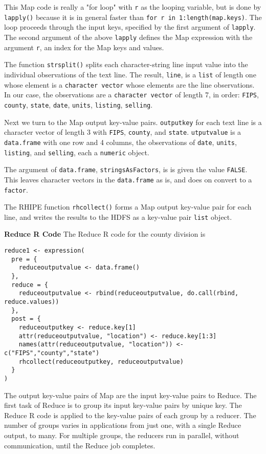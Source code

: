 This Map code is really a "for loop" with \texttt{r} as the looping variable,
but is done by \texttt{lapply()} because it is
in general faster than \texttt{for r in 1:length(map.keys)}.
The loop proceeds through the input keys, specified by the first argument of
\texttt{lapply}.  The second argument of the above \texttt{lapply} defines the Map expression
with the argument \texttt{r}, an index for the Map keys and values.

The function \texttt{strsplit()} splits each character-string line input value
into the individual observations of the text line. The result, \texttt{line},
is a \texttt{list} of length one whose element is a \texttt{character vector} whose elements
are the line observations. In our case, the
observations are a \texttt{character vector} of length 7, in order:
\texttt{FIPS}, \texttt{county}, \texttt{state}, \texttt{date}, \texttt{units}, \texttt{listing},
\texttt{selling}.

Next we turn to the Map output key-value pairs.
\texttt{outputkey} for each text line is a character vector of length 3 with \texttt{FIPS},
\texttt{county}, and \texttt{state}. \texttt{utputvalue} is a \texttt{data.frame} with one row
and 4 columns, the observations of \texttt{date}, \texttt{units}, \texttt{listing}, and
\texttt{selling}, each a \texttt{numeric} object.

The argument of \texttt{data.frame}, \texttt{stringsAsFactors}, is
is given the value \texttt{FALSE}. This leaves character vectors in the \texttt{data.frame}
as is, and does on convert to a \texttt{factor}.

The RHIPE function \texttt{rhcollect()} forms a Map output key-value pair for each
line, and writes the results to the HDFS as a key-value pair \texttt{list} object.

\textbf{Reduce R Code}
The Reduce R code for the county division is

\begin{verbatim}
reduce1 <- expression(
  pre = {
    reduceoutputvalue <- data.frame()
  },
  reduce = {
    reduceoutputvalue <- rbind(reduceoutputvalue, do.call(rbind, reduce.values))
  },
  post = {
    reduceoutputkey <- reduce.key[1]
    attr(reduceoutputvalue, "location") <- reduce.key[1:3]
    names(attr(reduceoutputvalue, "location")) <- c("FIPS","county","state")
    rhcollect(reduceoutputkey, reduceoutputvalue)
  }
)
\end{verbatim}

The output key-value pairs of Map are the input key-value pairs to Reduce.
The first task of Reduce is to group its input key-value pairs by unique key.
The Reduce R code is applied to the key-value pairs of each group by a
reducer. The number of groups varies in applications from just one, with a
single Reduce output, to many.
For multiple groups, the reducers run in parallel, without communication,
until the Reduce job completes.

